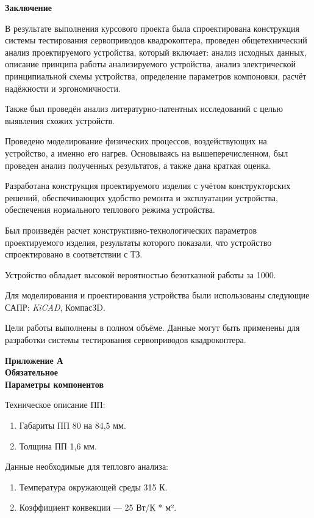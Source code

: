 \begin{center}
\textbf{Заключение}
\end{center}

В результате выполнения курсового проекта была спроектирована конструкция
системы тестирования сервоприводов квадрокоптера,
проведен общетехнический анализ проектируемого устройства,
который включает: анализ исходных
данных, описание принципа работы анализируемого устройства, анализ
электрической принципиальной схемы устройства,
определение параметров компоновки, расчёт надёжности и эргономичности.

Также был проведён анализ литературно-патентных исследований с
целью выявления схожих устройств.

Проведено моделирование физических процессов, воздействующих на
устройство, а именно его нагрев.
Основываясь на вышеперечисленном, был проведен анализ полученных
результатов, а также дана краткая оценка.

Разработана конструкция проектируемого изделия с учётом
конструкторских решений, обеспечивающих удобство ремонта и
эксплуатации устройства, обеспечения нормального теплового режима
устройства.

Был произведён расчет конструктивно-технологических параметров
проектируемого изделия, результаты которого показали, что устройство
спроектировано в соответствии с ТЗ.

Устройство обладает высокой вероятностью безотказной работы за 1000.

Для моделирования и проектирования устройства были использованы
следующие САПР: \textit{KiCAD}, Компас3D.

Цели работы выполнены в полном объёме. Данные могут быть применены для
разработки системы тестирования сервоприводов квадрокоптера.

\newpage

\begin{center}
\textbf{Приложение А}\\
\textbf{Обязательное}\\
\textbf{Параметры компонентов}
\end{center}

Техническое описание ПП:
\begin{enumerate}[label={\arabic*.}]
\item Габариты ПП 80 на 84,5 мм.
\item Толщина ПП 1,6 мм.
\end{enumerate}

Данные необходимые для тепловго анализа:
\begin{enumerate}[label={\arabic*.}]
\item Температура окружающей среды 315 К.
\item Коэффициент конвекции — 25 Вт/К * м².
\end{enumerate}


\newpage
